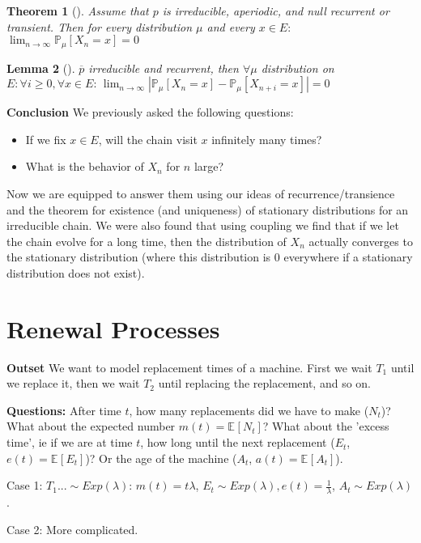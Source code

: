\documentclass[12pt]{book}
\newtheorem{theorem}{Theorem}[section]
\newtheorem{lemma}[theorem]{Lemma}
\theoremstyle{definition}
\theoremstyle{remark}
\begin{document}
\begin{theorem}[]
	Assume that $p$ is irreducible, aperiodic, and null recurrent or transient. Then for every distribution $\mu $ and every $x \in E:$ $\lim_{n \to \infty}\mathbb{P}_{\mu } \left[ X_n =x \right] = 0$ 
\end{theorem}
\begin{lemma}[]
	$\overline{p}$ irreducible and recurrent, then $\forall \mu $ distribution on $E: \forall i\geq 0, \forall x \in E:\, \lim_{n \to \infty} | \mathbb{P}_{\mu } \left[ X_n=x \right] - \mathbb{P}_{\mu } \left[ X_{n+i}=x \right] | = 0$
\end{lemma}

\noindent \textbf{Conclusion} We previously asked the following questions:
\begin{itemize}
	\item If we fix $x \in E$, will the chain visit $x$ infinitely many times?
	\item What is the behavior of $X_n$ for $n$ large?
\end{itemize}
Now we are equipped to answer them using our ideas of recurrence/transience and the theorem for existence (and uniqueness) of stationary distributions for an irreducible chain. We were also found that using coupling we find that if we let the chain evolve for a long time, then the distribution of $X_n$ actually converges to the stationary distribution (where this distribution is 0 everywhere if a stationary distribution does not exist).

\section{Renewal Processes}
\textbf{Outset} We want to model replacement times of a machine. First we wait $T_1$ until we replace it, then we wait $T_2$ until replacing the replacement, and so on.

\noindent
\textbf{Questions:} After time $t$, how many replacements did we have to make ($N_t$)? What about the expected number $m(t)=\mathbb{E}_{} \left[ N_t \right] $?
What about the 'excess time', ie if we are at time $t$, how long until the next replacement ($E_t$, $e(t)=\mathbb{E}_{} \left[ E_t \right]$)? Or the age of the machine ($A_t$, $a(t)=\mathbb{E}_{} \left[ A_t \right] $).

Case 1: $T_1... \sim Exp(\lambda)$: $m(t)=t\lambda$, $E_t \sim Exp(\lambda), e(t)= \frac{1}{\lambda}$, $A_t \sim Exp(\lambda)$.

Case 2: More complicated.
\end{document}
